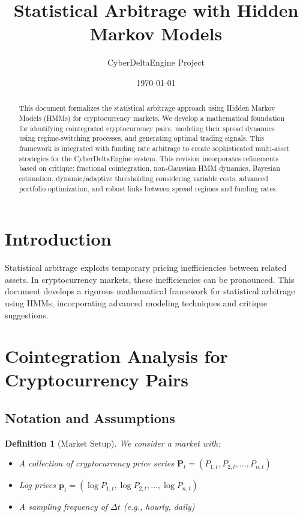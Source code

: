 \documentclass{article}
\title{Statistical Arbitrage with Hidden Markov Models}
\author{CyberDeltaEngine Project}
\date{\today}
\newtheorem{definition}{Definition}
\begin{document}
\maketitle

\begin{abstract}
This document formalizes the statistical arbitrage approach using Hidden Markov Models (HMMs) for cryptocurrency markets. We develop a mathematical foundation for identifying cointegrated cryptocurrency pairs, modeling their spread dynamics using regime-switching processes, and generating optimal trading signals. This framework is integrated with funding rate arbitrage to create sophisticated multi-asset strategies for the CyberDeltaEngine system. This revision incorporates refinements based on critique: fractional cointegration, non-Gaussian HMM dynamics, Bayesian estimation, dynamic/adaptive thresholding considering variable costs, advanced portfolio optimization, and robust links between spread regimes and funding rates.
\end{abstract}

\section{Introduction}

Statistical arbitrage exploits temporary pricing inefficiencies between related assets. In cryptocurrency markets, these inefficiencies can be pronounced. This document develops a rigorous mathematical framework for statistical arbitrage using HMMs, incorporating advanced modeling techniques and critique suggestions.

\section{Cointegration Analysis for Cryptocurrency Pairs}

\subsection{Notation and Assumptions}

\begin{definition}[Market Setup]
We consider a market with:
\begin{itemize}
    \item A collection of cryptocurrency price series $\mathbf{P}_t = (P_{1,t}, P_{2,t}, \ldots, P_{n,t})$
    \item Log prices $\mathbf{p}_t = (\log P_{1,t}, \log P_{2,t}, \ldots, \log P_{n,t})$
    \item A sampling frequency of $\Delta t$ (e.g., hourly, daily)
\end{itemize}
\end{definition}
\end{document}
